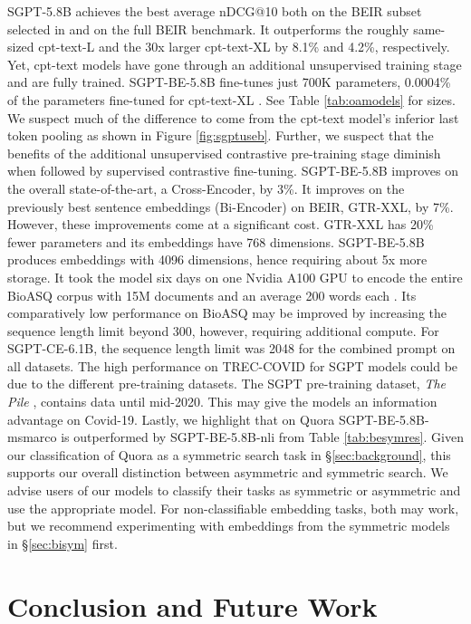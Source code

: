 \documentclass{article}
\begin{document}
SGPT-5.8B achieves the best average nDCG@10 both on the BEIR subset selected in \cite{neelakantan2022text} and on the full BEIR benchmark. It outperforms the roughly same-sized cpt-text-L and the 30x larger cpt-text-XL by 8.1\% and 4.2\%, respectively. Yet, cpt-text models have gone through an additional unsupervised training stage \cite{neelakantan2022text} and are fully trained. SGPT-BE-5.8B fine-tunes just 700K parameters, 0.0004\% of the parameters fine-tuned for cpt-text-XL \cite{neelakantan2022text}. See Table \ref{tab:oamodels} for sizes. We suspect much of the difference to come from the cpt-text model's inferior last token pooling as shown in Figure \ref{fig:sgptuseb}. Further, we suspect that the benefits of the additional unsupervised contrastive pre-training stage diminish when followed by supervised contrastive fine-tuning. SGPT-BE-5.8B improves on the overall state-of-the-art, a Cross-Encoder, by 3\%. It improves on the previously best sentence embeddings (Bi-Encoder) on BEIR, GTR-XXL, by 7\%. However, these improvements come at a significant cost. GTR-XXL has 20\% fewer parameters and its embeddings have 768 dimensions. SGPT-BE-5.8B produces embeddings with 4096 dimensions, hence requiring about 5x more storage. It took the model six days on one Nvidia A100 GPU to encode the entire BioASQ corpus with 15M documents and an average 200 words each \cite{thakur2021beir}. Its comparatively low performance on BioASQ may be improved by increasing the sequence length limit beyond 300, however, requiring additional compute. For SGPT-CE-6.1B, the sequence length limit was 2048 for the combined prompt on all datasets. The high performance on TREC-COVID for SGPT models could be due to the different pre-training datasets. The SGPT pre-training dataset, \textit{The Pile} \cite{gao2020pile}, contains data until mid-2020. This may give the models an information advantage on Covid-19. Lastly, we highlight that on Quora SGPT-BE-5.8B-msmarco is outperformed by SGPT-BE-5.8B-nli from Table \ref{tab:besymres}. Given our classification of Quora as a symmetric search task in \S\ref{sec:background}, this supports our overall distinction between asymmetric and symmetric search. We advise users of our models to classify their tasks as symmetric or asymmetric and use the appropriate model. For non-classifiable embedding tasks, both may work, but we recommend experimenting with embeddings from the symmetric models in \S\ref{sec:bisym} first.

\section{Conclusion and Future Work}\label{sec:conclusion}
\end{document}
